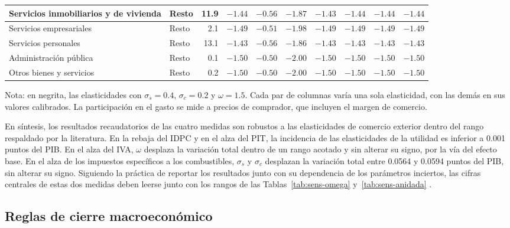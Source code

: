 \documentclass[11pt]{article}
\begin{document}
\begin{table}[H]
{\begin{tabular}{|l|l|r|r|r|r|r|r|r|r|}
  \hline
  Servicios inmobiliarios y de vivienda & Resto & 11.9 & $\mathbf{-1.44}$ & $-0.56$ & $-1.87$ & $-1.43$ & $-1.44$ & $-1.44$ & $-1.44$ \\
  \hline
  Servicios empresariales & Resto & 2.1 & $\mathbf{-1.49}$ & $-0.51$ & $-1.98$ & $-1.49$ & $-1.49$ & $-1.49$ & $-1.49$ \\
  \hline
  Servicios personales & Resto & 13.1 & $\mathbf{-1.43}$ & $-0.56$ & $-1.86$ & $-1.43$ & $-1.43$ & $-1.43$ & $-1.43$ \\
  \hline
  Administración pública & Resto & 0.1 & $\mathbf{-1.50}$ & $-0.50$ & $-2.00$ & $-1.50$ & $-1.50$ & $-1.50$ & $-1.50$ \\
  \hline
  Otros bienes y servicios & Resto & 0.2 & $\mathbf{-1.50}$ & $-0.50$ & $-2.00$ & $-1.50$ & $-1.50$ & $-1.50$ & $-1.50$ \\
  \hline
\end{tabular}%
}
\par\smallskip
\begin{minipage}{\textwidth}
\footnotesize Nota: en negrita, las elasticidades con $\sigma_{s}=0.4$, $\sigma_{c}=0.2$ y $\omega=1.5$. Cada par de columnas varía una sola elasticidad, con las demás en sus valores calibrados. La participación en el gasto se mide a precios de comprador, que incluyen el margen de comercio.
\end{minipage}
\end{table}

En síntesis, los resultados recaudatorios de las cuatro medidas son robustos a las elasticidades de comercio exterior dentro del rango respaldado por la literatura. En la rebaja del IDPC y en el alza del PIT, la incidencia de las elasticidades de la utilidad es inferior a 0.001 puntos del PIB. En el alza del IVA, $\omega$ desplaza la variación total dentro de un rango acotado y sin alterar su signo, por la vía del efecto base. En el alza de los impuestos específicos a los combustibles, $\sigma_{s}$ y $\sigma_{c}$ desplazan la variación total entre 0.0564 y 0.0594 puntos del PIB, sin alterar su signo. Siguiendo la práctica de reportar los resultados junto con su dependencia de los parámetros inciertos, las cifras centrales de estas dos medidas deben leerse junto con los rangos de las Tablas~\ref{tab:sens-omega} y~\ref{tab:sens-anidada} \cite{harrison_vinod_1992,dixon_rimmer_2013}.

\subsection{Reglas de cierre macroeconómico}
\label{sec:sens-cierres}
\end{document}
